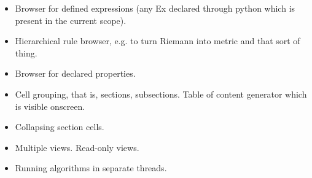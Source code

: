 
\begin{itemize}

\item Browser for defined expressions (any Ex declared through python
  which is present in the current scope).

\item Hierarchical rule browser, e.g. to turn Riemann into metric and
  that sort of thing.

\item Browser for declared properties.

\item Cell grouping, that is, sections, subsections. Table of content
  generator which is visible onscreen. 

\item Collapsing section cells.

\item Multiple views. Read-only views.

\item Running algorithms in separate threads.

\end{itemize}
